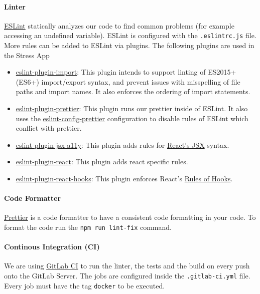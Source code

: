 \paragraph{Linter}
\href{https://eslint.org}{ESLint} statically analyzes our code to find common problems (for example accessing an undefined variable). 
ESLint is configured with the \texttt{.eslintrc.js} file. 
More rules can be added to ESLint via plugins. 
The following plugins are used in the Stress App
\begin{itemize}
    \item \href{https://www.npmjs.com/package/eslint-plugin-import}{eslint-plugin-import}: 
      This plugin intends to support linting of ES2015+ (ES6+) import/export syntax, and prevent issues with misspelling of file paths and import names. 
      It also enforces the ordering of import statements.
    \item \href{https://www.npmjs.com/package/eslint-plugin-prettier}{eslint-plugin-prettier}:
      This plugin runs our  prettier inside of ESLint. 
      It also uses the \href{https://www.npmjs.com/package/eslint-config-prettier}{eslint-config-prettier} configuration to disable rules of ESLint which conflict with prettier.
    \item \href{https://www.npmjs.com/package/eslint-plugin-jsx-a11y}{eslint-plugin-jsx-a11y}: This plugin adds rules for \href{https://reactjs.org/docs/introducing-jsx.html}{React's JSX} syntax.
    \item \href{https://www.npmjs.com/package/eslint-plugin-react}{eslint-plugin-react}: This plugin adds react specific rules.
    \item \href{https://www.npmjs.com/package/eslint-plugin-react-hooks}{eslint-plugin-react-hooks}: This plugin enforces React's \href{https://reactjs.org/docs/hooks-rules.html}{Rules of Hooks}.
\end{itemize}

\paragraph{Code Formatter}
\label{sec:code-formatter}
\href{https://prettier.io}{Prettier} is a code formatter to have a consistent code formatting in your code. 
To format the code run the \texttt{npm run lint-fix} command.

\paragraph{Continous Integration (CI)}
We are using \href{https://mad-srv.informatik.uni-erlangen.de/help/ci/README.md}{GitLab CI} to run the linter, the tests and the build on every push onto the GitLab Server. 
The jobs are configured inside the \texttt{.gitlab-ci.yml} file. 
Every job must have the tag \texttt{docker} to be executed.

